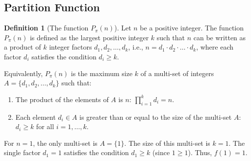 \documentclass[]{article}
\theoremstyle{plain}%
\theoremstyle{definition}
\newtheorem{defn}{Definition}[section]
\theoremstyle{remark}
\begin{document}
\subsection{Partition Function}
\begin{defn}[The function $P_{\pi}(n)$]
	\label{defn:part_func}
	Let $n$ be a positive integer. The function $P_{\pi}(n)$ is defined as the largest positive integer $k$ such that $n$ can be written as a product of $k$ integer factors $d_1, d_2, \ldots, d_k$, i.e., $n = d_1 \cdot d_2 \cdot \ldots \cdot d_k$, where each factor $d_i$ satisfies the condition $d_i \ge k$.
	
	Equivalently, $P_{\pi}(n)$ is the maximum size $k$ of a multi-set of integers $A = \{d_1, d_2, \ldots, d_k\}$ such that:
	\begin{enumerate}
		\item The product of the elements of $A$ is $n$: $\prod_{i=1}^k d_i = n$.
		\item Each element $d_i \in A$ is greater than or equal to the size of the multi-set $A$: $d_i \ge k$ for all $i=1, \ldots, k$.
	\end{enumerate}
	For $n=1$, the only multi-set is $A=\{1\}$. The size of this multi-set is $k=1$. The single factor $d_1=1$ satisfies the condition $d_1 \ge k$ (since $1 \ge 1$). Thus, $f(1)=1$.
\end{defn}
\end{document}
